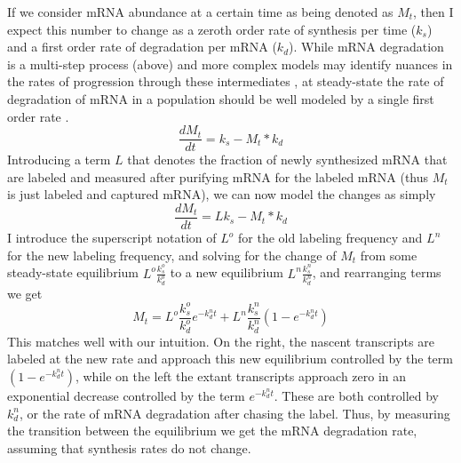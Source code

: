 If we consider mRNA abundance at a
certain time as being denoted as $M_t$, then I expect this number to
change as a zeroth order rate of synthesis per time ($k_s$) and a
first order rate of degradation per mRNA ($k_d$). While mRNA
degradation is a multi-step process (above) and more complex models
may identify nuances in the rates of progression through these
intermediates \parencite{deneke2013complex}, at steady-state the rate of
degradation of mRNA in a population should be well modeled by a single
first order rate \parencite{thattai2016universal}.
$$\frac{dM_t}{dt} = k_s - M_t*k_d$$ Introducing a term $L$ that
denotes the fraction of newly synthesized mRNA that are labeled and
measured after purifying mRNA for the labeled mRNA (thus $M_t$ is just
labeled and captured mRNA), we can now model the changes as simply
$$\frac{dM_t}{dt} = L k_s - M_t*k_d$$ I introduce the superscript
notation of $L^o$ for the old labeling frequency and $L^n$ for the new
labeling frequency, and solving for the change of $M_t$ from some
steady-state equilibrium $L^o \frac{k_s^o}{k_d^o}$ to a new
equilibrium $L^n \frac{k_s^n}{k_d^n}$, and rearranging terms we get
$$M_t =  L^o \frac{k_s^o}{k_d^o} e^{-k_d^n t} + L^n \frac{k_s^n}{k_d^n} ( 1- e^{-k_d^n t} )$$ 
This matches well with our
intuition. On the right, the nascent transcripts are labeled at the
new rate and approach this new equilibrium controlled by the term $(
1- e^{-k_d^n t} )$, while on the left the extant transcripts approach
zero in an exponential decrease controlled by the term $e^{-k_d^n t}$.
These are both controlled by $k_d^n$, or the rate of mRNA degradation
after chasing the label. Thus, by measuring the transition between the
equilibrium we get the mRNA degradation rate, assuming that synthesis
rates do not change.  

